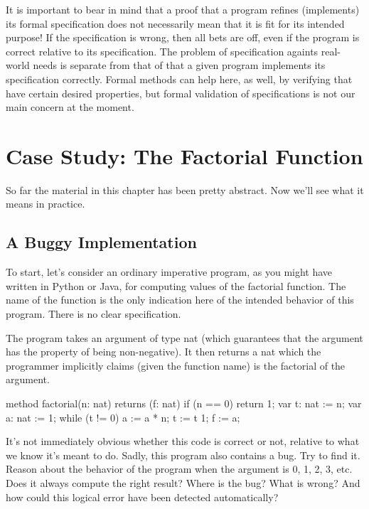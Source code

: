 \documentclass[letterpaper,10pt,english]{sphinxmanual}
\begin{document}
It is important to bear in mind that a proof that a program refines
(implements) its formal specification does not necessarily mean that
it is fit for its intended purpose! If the specification is wrong,
then all bets are off, even if the program is correct relative to its
specification.  The problem of  specification againts
real-world needs is separate from that of  that a given
program implements its specification correctly. Formal methods can
help here, as well, by verifying that  have certain
desired properties, but formal validation of specifications is not
our main concern at the moment.


\section{Case Study: The Factorial Function}
\label{\detokenize{05-putting-it-together:case-study-the-factorial-function}}
So far the material in this chapter has been pretty abstract. Now
we’ll see what it means in practice.


\subsection{A Buggy Implementation}
\label{\detokenize{05-putting-it-together:a-buggy-implementation}}
To start, let’s consider an ordinary imperative program, as you might
have written in Python or Java, for computing values of the factorial
function. The name of the function is the only indication here of the
intended behavior of this program. There is no clear specification.

The program takes an argument of type nat (which guarantees that the
argument has the property of being non-negative). It then returns a
nat which the programmer implicitly claims (given the function name)
is the factorial of the argument.

\begin{sphinxVerbatim}[commandchars=\\\{\}]
method factorial(n: nat) returns (f: nat)
\PYGZob{}
    if (n == 0)
    \PYGZob{}
        return 1;
    \PYGZcb{}
    var t: nat := n;
    var a: nat := 1;
    while (t !=  0)
    \PYGZob{}
        a := a * n;
        t := t \PYGZhy{} 1;
    \PYGZcb{}
    f := a;
\PYGZcb{}
\end{sphinxVerbatim}

It’s not immediately obvious whether this code is correct or not,
relative to what we know it’s meant to do. Sadly, this program also
contains a bug. Try to find it. Reason about the behavior of the
program when the argument is 0, 1, 2, 3, etc.  Does it always compute
the right result? Where is the bug? What is wrong? And how could this
logical error have been detected automatically?
\end{document}
